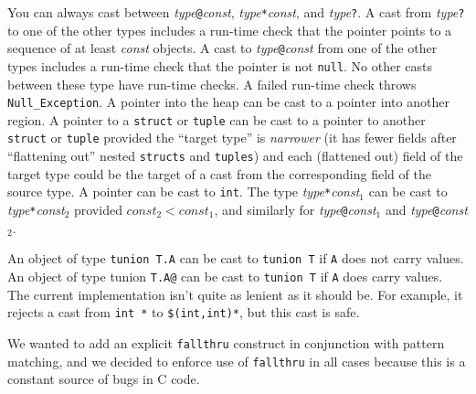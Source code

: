 You can always cast between
\textit{type}\texttt{@}\lb\textit{const}\rb,
\textit{type}\texttt{*}\lb\textit{const}\rb, and
\textit{type}\texttt{?}.
A cast from 
\textit{type}\texttt{?}
to one of the other types includes a run-time check that the pointer
points to a sequence of at least \textit{const} objects.
A cast to
\textit{type}\texttt{@}\lb\textit{const}\rb
from one of the
other types includes a run-time check that the pointer is not
\texttt{null}.
No other casts between these type have run-time checks.
A failed run-time check throws \texttt{Null_Exception}.
A pointer into the heap can be cast to a pointer into another region.
A pointer to a \texttt{struct} or \texttt{tuple} can be
cast to a pointer to another \texttt{struct} or \texttt{tuple}
provided the ``target type'' 
is \emph{narrower} (it has fewer fields after ``flattening out'' nested
\texttt{structs} and \texttt{tuples}) and each (flattened out) field
of the target type could be the target of a cast from the
corresponding field of the source type.
A pointer can be cast to \texttt{int}.
The type
\textit{type}\texttt{*}\lb\textit{const}$_1$\rb
can be cast to
\textit{type}\texttt{*}\lb\textit{const}$_2$\rb
provided
$\textit{const}_2 < \textit{const}_1$, and similarly for
\textit{type}\texttt{@}\lb\textit{const}$_1$\rb
and
\textit{type}\texttt{@}\lb\textit{const}$_2$\rb.

An object of type \texttt{tunion T.A} can be cast to \texttt{tunion T}
if \texttt{A} does not carry values.  An object of type tunion
\texttt{T.A@} can be cast to \texttt{tunion T} if \texttt{A} does
carry values.  The current implementation isn't quite as lenient as it
should be.  For example, it rejects a cast from \texttt{int *\rb} to
\texttt{\$(int,int)*\rb}, but this cast is safe.


We wanted to add an explicit \texttt{fallthru} construct in
conjunction with pattern matching, and we decided to enforce use of
\texttt{fallthru} in all cases because this is a constant source of
bugs in C code.


